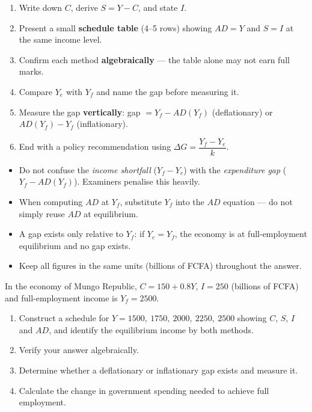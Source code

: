 \documentclass[11pt]{article}
\begin{document}
\begin{methode}
\begin{enumerate}
\item Write down $C$, derive $S = Y - C$, and state $I$.
\item Present a small \textbf{schedule table} (4--5 rows) showing $AD = Y$ and $S = I$ at the same income level.
\item Confirm each method \textbf{algebraically} — the table alone may not earn full marks.
\item Compare $Y_e$ with $Y_f$ and name the gap before measuring it.
\item Measure the gap \textbf{vertically}: gap $= Y_f - AD(Y_f)$ (deflationary) or $AD(Y_f) - Y_f$ (inflationary).
\item End with a policy recommendation using $\Delta G = \dfrac{Y_f - Y_e}{k}$.
\end{enumerate}
\end{methode}

\begin{attention}
\begin{itemize}
\item Do not confuse the \emph{income shortfall} ($Y_f - Y_e$) with the \emph{expenditure gap} ($Y_f - AD(Y_f)$). Examiners penalise this heavily.
\item When computing $AD$ at $Y_f$, substitute $Y_f$ into the $AD$ equation — do not simply reuse $AD$ at equilibrium.
\item A gap exists only relative to $Y_f$: if $Y_e = Y_f$, the economy is at full-employment equilibrium and no gap exists.
\item Keep all figures in the same units (billions of FCFA) throughout the answer.
\end{itemize}
\end{attention}

\begin{exercice}[Practice]
In the economy of Mungo Republic, $C = 150 + 0.8Y$, $I = 250$ (billions of FCFA) and full-employment income is $Y_f = 2500$.
\begin{enumerate}
\item Construct a schedule for $Y = 1500,\ 1750,\ 2000,\ 2250,\ 2500$ showing $C$, $S$, $I$ and $AD$, and identify the equilibrium income by both methods.
\item Verify your answer algebraically.
\item Determine whether a deflationary or inflationary gap exists and measure it.
\item Calculate the change in government spending needed to achieve full employment.
\end{enumerate}
\end{exercice}
\end{document}
